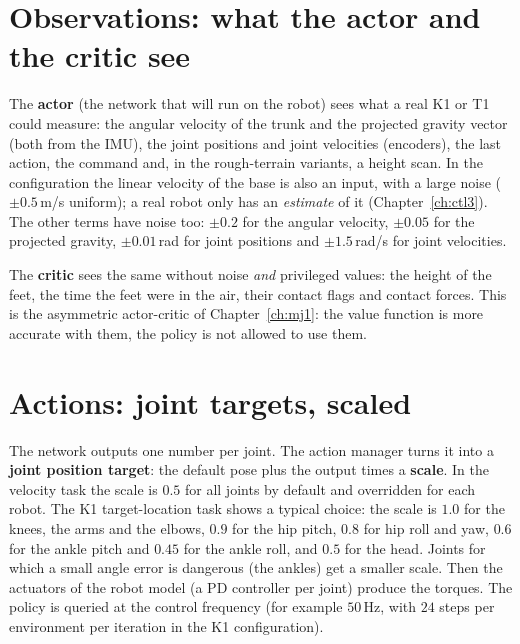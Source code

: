 \section*{Observations: what the actor and the critic see}
The \textbf{actor} (the network that will run on the robot) sees what a real K1 or T1 could measure: the angular velocity of the trunk and the projected gravity vector (both from the IMU), the joint positions and joint velocities (encoders), the last action, the command and, in the rough-terrain variants, a height scan. In the configuration the linear velocity of the base is also an input, with a large noise ($\pm0.5$\,m/s uniform); a real robot only has an \emph{estimate} of it (Chapter~\ref{ch:ctl3}). The other terms have noise too: $\pm0.2$ for the angular velocity, $\pm0.05$ for the projected gravity, $\pm0.01$\,rad for joint positions and $\pm1.5$\,rad/s for joint velocities.

The \textbf{critic} sees the same without noise \emph{and} privileged values: the height of the feet, the time the feet were in the air, their contact flags and contact forces. This is the asymmetric actor-critic of Chapter~\ref{ch:mj1}: the value function is more accurate with them, the policy is not allowed to use them.

\section*{Actions: joint targets, scaled}
The network outputs one number per joint. The action manager turns it into a \textbf{joint position target}: the default pose plus the output times a \textbf{scale}. In the velocity task the scale is $0.5$ for all joints by default and overridden for each robot. The K1 target-location task shows a typical choice: the scale is $1.0$ for the knees, the arms and the elbows, $0.9$ for the hip pitch, $0.8$ for hip roll and yaw, $0.6$ for the ankle pitch and $0.45$ for the ankle roll, and $0.5$ for the head. Joints for which a small angle error is dangerous (the ankles) get a smaller scale. Then the actuators of the robot model (a PD controller per joint) produce the torques. The policy is queried at the control frequency (for example $50$\,Hz, with $24$ steps per environment per iteration in the K1 configuration).


